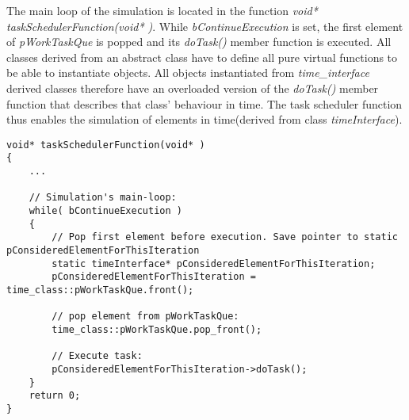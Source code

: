 			The main loop of the simulation is located in the function \emph{void* taskSchedulerFunction(void* )}.
			While \emph{bContinueExecution} is set, the first element of \emph{pWorkTaskQue} is popped and its \emph{doTask()} member function is executed.
			All classes derived from an abstract class have to define all pure virtual functions to be able to instantiate objects\cite{Stroustrup2000KAP12}.
			All objects instantiated from \emph{time\_interface} derived classes therefore have an overloaded version of the \emph{doTask()} member function that describes that class' behaviour in time.
			The task scheduler function thus enables the simulation of elements in time(derived from class \emph{timeInterface}).

\begin{lstlisting}
void* taskSchedulerFunction(void* )
{
	...
	
    // Simulation's main-loop:
    while( bContinueExecution )
    {
        // Pop first element before execution. Save pointer to static pConsideredElementForThisIteration
        static timeInterface* pConsideredElementForThisIteration;
        pConsideredElementForThisIteration = time_class::pWorkTaskQue.front();

        // pop element from pWorkTaskQue:
        time_class::pWorkTaskQue.pop_front();

        // Execute task:
        pConsideredElementForThisIteration->doTask();
    }
    return 0;
}
\end{lstlisting}
			
